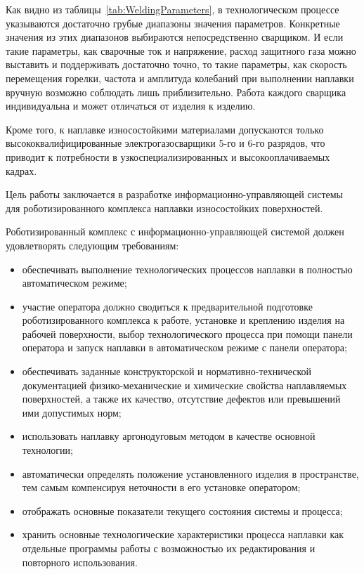 Как видно из таблицы~\ref{tab:WeldingParameters}, в технологическом процессе указываются достаточно грубые диапазоны значения параметров.
Конкретные значения из этих диапазонов выбираются непосредственно сварщиком.
И если такие параметры, как сварочные ток и напряжение, расход защитного газа можно выставить и поддерживать достаточно точно, то такие параметры, как скорость перемещения горелки, частота и амплитуда колебаний при выполнении наплавки вручную возможно соблюдать лишь приблизительно.
Работа каждого сварщика индивидуальна и может отличаться от изделия к изделию.

Кроме того, к наплавке износостойкими материалами допускаются только высококвалифицированные электрогазосварщики 5-го и 6-го разрядов, что приводит к потребности в узкоспециализированных и высокооплачиваемых кадрах.

Цель работы заключается в разработке информационно-управляющей системы для роботизированного комплекса наплавки износостойких поверхностей.

Роботизированный комплекс с информационно-управляющей системой должен удовлетворять следующим требованиям:

\begin{itemize}
    \item обеспечивать выполнение технологических процессов наплавки в полностью автоматическом режиме;
    \item участие оператора должно сводиться к предварительной подготовке роботизированного комплекса к работе, установке и креплению изделия на рабочей поверхности, выбор технологического процесса при помощи панели оператора и запуск наплавки в автоматическом режиме с панели оператора;
    \item обеспечивать заданные конструкторской и нормативно-технической документацией физико-механические и химические свойства наплавляемых поверхностей, а также их качество, отсутствие дефектов или превышений ими допустимых норм;
    \item использовать наплавку аргонодуговым методом в качестве основной технологии;
    \item автоматически определять положение установленного изделия в пространстве, тем самым компенсируя неточности в его установке оператором;
    \item отображать основные показатели текущего состояния системы и процесса;
    \item хранить основные технологические характеристики процесса наплавки как отдельные программы работы с возможностью их редактирования и повторного использования.
\end{itemize}

